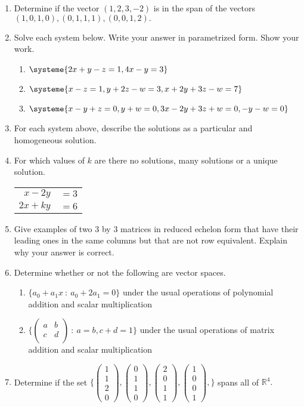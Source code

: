\documentclass[11pt,fleqn]{article}
\newcommand{\bpm}{\begin{pmatrix}}
\newcommand{\epm}{\end{pmatrix}}
\begin{document}
\begin{enumerate}

\item Determine if the vector $(1,2,3,-2)$ is in the span of the vectors $(1,0,1,0), (0,1,1,1),(0,0,1,2).$

\item Solve each system below. Write your answer in parametrized form. Show your work.
	\begin{enumerate}
	\item $\systeme{2x+y-z=1,4x-y=3}$
	\item $\systeme{x-z=1,y+2z-w=3,x+2y+3z-w=7}$
	\item $\systeme{x-y+z=0,y+w=0,3x-2y+3z+w=0,-y-w=0}$
	\end{enumerate}
	
\item For each system above, describe the solutions as a particular and homogeneous solution.

\item For which values of $k$ are there no solutions, many solutions or a unique solution.\\

\begin{tabular}{rl}
$x-2y$&$=3$\\$2x+ky$&$=6$
\end{tabular}

\item Give examples of two 3 by 3 matrices in reduced echelon form that have their leading ones in the same columns but that are not row equivalent. Explain why your answer is correct.\\

\item Determine whether or not the following are vector spaces.
	\begin{enumerate}
	\item $ \{ a_0+a_1x \: : \: a_0+2a_1=0 \} $ under the usual operations of polynomial addition and scalar multiplication
	\item $ \{ \bpm a& b \\ c& d\\ \epm \: : \: a=b, c+d=1 \} $ under the usual operations of matrix addition and scalar multiplication
	\end{enumerate}
	
\item Determine if the set $\{  \bpm 1\\1\\2\\0\epm,  \bpm 0\\1\\1\\0\epm,  \bpm 2\\0\\1\\1\epm,  \bpm 1\\0\\0\\1\epm,\} $ spans all of $\mathbb{R}^4.$


\end{enumerate}
\end{document}
